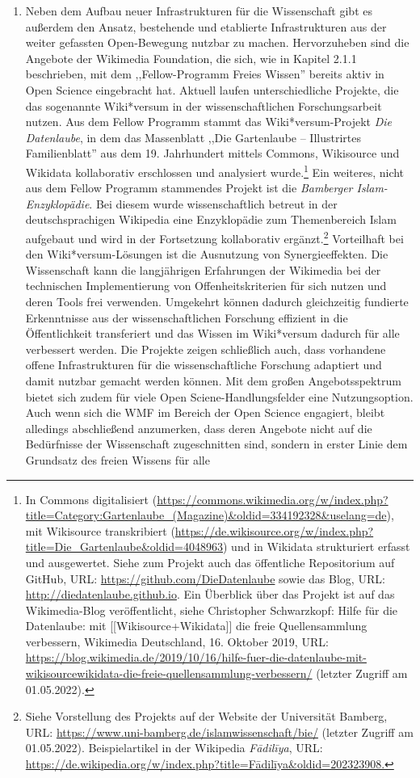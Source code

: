 \begin{enumerate}
\item Neben dem Aufbau neuer Infrastrukturen für die Wissenschaft gibt es außerdem den Ansatz, bestehende und etablierte Infrastrukturen aus der weiter gefassten Open-Bewegung nutzbar zu machen. Hervorzuheben sind die Angebote der Wikimedia Foundation, die sich, wie in Kapitel 2.1.1 beschrieben, mit dem ,,Fellow-Programm Freies Wissen'' bereits aktiv in Open Science eingebracht hat. Aktuell laufen unterschiedliche Projekte, die das sogenannte Wiki*versum in der wissenschaftlichen Forschungsarbeit nutzen. Aus dem Fellow Programm stammt das Wiki*versum-Projekt \textit{Die Datenlaube}, in dem das Massenblatt ,,Die Gartenlaube – Illustrirtes Familienblatt'' aus dem 19. Jahrhundert mittels Commons, Wikisource und Wikidata kollaborativ erschlossen und analysiert wurde.\footnote{In Commons digitalisiert (\url{https://commons.wikimedia.org/w/index.php?title=Category:Gartenlaube_(Magazine)&oldid=334192328&uselang=de}), mit Wikisource transkribiert (\url{https://de.wikisource.org/w/index.php?title=Die_Gartenlaube&oldid=4048963}) und in Wikidata strukturiert erfasst und ausgewertet. Siehe zum Projekt auch das öffentliche Repositorium auf GitHub, URL: \url{https://github.com/DieDatenlaube} sowie das Blog, URL: \url{http://diedatenlaube.github.io}. Ein Überblick über das Projekt ist auf das Wikimedia-Blog veröffentlicht, siehe Christopher Schwarzkopf: Hilfe für die Datenlaube: mit [[Wikisource+Wikidata]] die freie Quellensammlung verbessern, Wikimedia Deutschland, 16. Oktober 2019, URL: \url{https://blog.wikimedia.de/2019/10/16/hilfe-fuer-die-datenlaube-mit-wikisourcewikidata-die-freie-quellensammlung-verbessern/} (letzter Zugriff am 01.05.2022).} Ein weiteres, nicht aus dem Fellow Programm stammendes Projekt ist die \textit{Bamberger Islam-Enzyklopädie}. Bei diesem wurde wissenschaftlich betreut in der deutschsprachigen Wikipedia eine Enzyklopädie zum Themenbereich Islam aufgebaut und wird in der Fortsetzung kollaborativ ergänzt.\footnote{Siehe Vorstellung des Projekts auf der Website der Universität Bamberg, URL: \url{https://www.uni-bamberg.de/islamwissenschaft/bie/} (letzter Zugriff am 01.05.2022). Beispielartikel in der Wikipedia \textit{Fādilīya}, URL: \url{https://de.wikipedia.org/w/index.php?title=Fādilīya&oldid=202323908.}} Vorteilhaft bei den Wiki*versum-Lösungen ist die Ausnutzung von Synergieeffekten. Die Wissenschaft kann die langjährigen Erfahrungen der Wikimedia bei der technischen Implementierung von Offenheitskriterien für sich nutzen und deren Tools frei verwenden. Umgekehrt können dadurch gleichzeitig fundierte Erkenntnisse aus der wissenschaftlichen Forschung effizient in die Öffentlichkeit transferiert und das Wissen im Wiki*versum dadurch für alle verbessert werden. Die Projekte zeigen schließlich auch, dass vorhandene offene Infrastrukturen für die wissenschaftliche Forschung adaptiert und damit nutzbar gemacht werden können. Mit dem großen Angebotsspektrum bietet sich zudem für viele Open Sciene-Handlungsfelder eine Nutzungsoption. Auch wenn sich die WMF im Bereich der Open Science engagiert, bleibt alledings abschließend anzumerken, dass deren Angebote nicht auf die Bedürfnisse der Wissenschaft zugeschnitten sind, sondern in erster Linie dem Grundsatz des freien Wissens für alle 
\end{enumerate}
